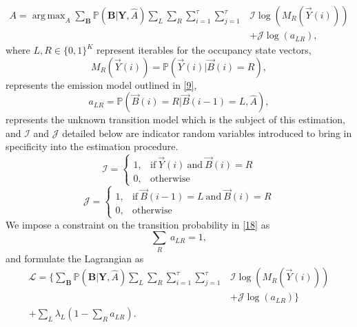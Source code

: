 \documentclass[10pt,twocolumn]{IEEEtran}
\DeclareMathOperator*{\argmax}{arg\,max}
\begin{document}
\begin{equation}\label{18}
    \begin{aligned}
        A=\argmax_{A}\sum_{\textbf{B}}\mathbb{P}(\textbf{B}|\textbf{Y},\hat{A})\sum_{L}\sum_{R}\sum_{i=1}^{\tau}\sum_{j=1}^{\tau}&\mathcal{I}\log(M_R(\vec{Y}(i)))\\
        &+\mathcal{J}\log(a_{LR}),
    \end{aligned}
\end{equation}
where $L,R \in \{0,1\}^K$ represent iterables for the occupancy state vectors,
\begin{equation}\label{19}
    M_R(\vec{Y}(i)) = \mathbb{P}(\vec{Y}(i)|\vec{B}(i)=R),
\end{equation}
represents the emission model outlined in \eqref{9},
\begin{equation}\label{20}
    a_{LR} = \mathbb{P}(\vec{B}(i)=R|\vec{B}(i-1)=L, \hat{A}),
\end{equation}
represents the unknown transition model which is the subject of this estimation, and $\mathcal{I}$ and $\mathcal{J}$ detailed below are indicator random variables introduced to bring in specificity into the estimation procedure.
\begin{equation}\label{21}
    \mathcal{I} = 
    \begin{cases}
        1, &\text{if}\ \vec{Y}(i)\ \text{and}\ \vec{B}(i)=R\\
        0, &\text{otherwise}
    \end{cases}
\end{equation}
\begin{equation}\label{22}
    \mathcal{J} = 
    \begin{cases}
        1, &\text{if}\ \vec{B}(i-1)=L\ \text{and}\ \vec{B}(i)=R\\
        0, &\text{otherwise}
    \end{cases}
\end{equation}
We impose a constraint on the transition probability in \eqref{18} as 
\begin{equation}\label{23}
    \sum_{R}\ a_{LR} = 1,    
\end{equation}
and formulate the Lagrangian as
\begin{equation}\label{24}
    \begin{aligned}
        \mathcal{L}=\Big\{\sum_{\textbf{B}}\mathbb{P}(\textbf{B}|\textbf{Y},\hat{A})\sum_{L}\sum_{R}\sum_{i=1}^{\tau}\sum_{j=1}^{\tau}&\mathcal{I}\log(M_R(\vec{Y}(i)))\\
        &+\mathcal{J}\log(a_{LR})\Big\}\\
        +\sum_{L}\lambda_L(1-\sum_Ra_{LR}).
    \end{aligned}
\end{equation}
\end{document}
